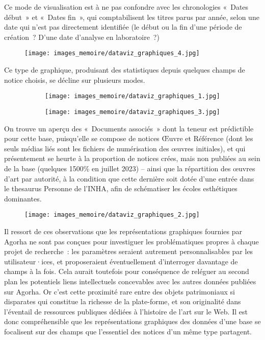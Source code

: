 \documentclass[a4paper,12pt, twoside]{book}
\begin{document}
Ce mode de visualisation est à ne pas confondre avec les chronologies «~Dates début~» et «~Dates fin~», qui comptabilisent les titres parus par année, selon une date qui n’est pas directement identifiée (le début ou la fin d’une période de création~? D’une date d’analyse en laboratoire~?)

\begin{figure}[!h]
    \centering
    \texttt{[image: images\_memoire/dataviz\_graphiques\_4.jpg]}
    \label{Une autre chronologie par Agorha}
\end{figure}

Ce type de graphique, produisant des statistiques depuis quelques champs de notice choisis, se décline sur plusieurs modes.

\begin{figure}[!h]
    \centering
    \begin{subfigure}{}
        \texttt{[image: images\_memoire/dataviz\_graphiques\_1.jpg]} 
    \end{subfigure}
    \begin{subfigure}{}
        \texttt{[image: images\_memoire/dataviz\_graphiques\_3.jpg]}
    \end{subfigure}
\end{figure}

On trouve un aperçu des «~Documents associés~» dont la teneur est prédictible pour cette base, puisqu’elle se compose de notices \textsf{Œuvre} et \textsf{Référence} (dont les seuls médias liés sont les fichiers de numérisation des œuvres initiales), et qui présentement se heurte à la proportion de notices crées, mais non publiées au sein de la base (quelques 1500\% en juillet 2023) -- ainsi que la répartition des œuvres d’art par autorité, à la condition que cette dernière soit dotée d’une entrée dans le thesaurus Personne de l’INHA, afin de schématiser les écoles esthétiques dominantes.

\begin{figure}[!h]
    \centering
    \texttt{[image: images\_memoire/dataviz\_graphiques\_2.jpg]}
\end{figure}

Il ressort de ces observations que les représentations graphiques fournies par Agorha ne sont pas conçues pour investiguer les problématiques propres à chaque projet de recherche~: les paramètres seraient autrement personnalisables par les utilisateur·ices, et proposeraient éventuellement d’interroger davantage de champs à la fois. Cela aurait toutefois pour conséquence de reléguer au second plan les potentiels liens intellectuels concevables avec les autres données publiées sur Agorha. Or c’est cette proximité rare entre des objets patrimoniaux si disparates qui constitue la richesse de la plate-forme, et son originalité dans l’éventail de ressources publiques dédiées à l’histoire de l’art sur le Web. Il est donc compréhensible que les représentations graphiques des données d’une base se focalisent sur des champs que l’essentiel des notices d’un même type partagent.
\end{document}

